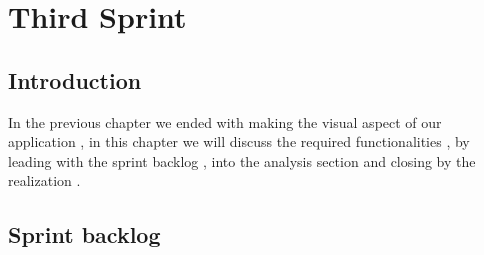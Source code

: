 \documentclass[]{report}
\begin{document}
\chapter{Third Sprint}

\section{Introduction}

In the previous chapter we ended with making the visual aspect of our application , in this chapter we will discuss the required functionalities , by leading with the sprint backlog , into the analysis section and closing by the realization .

\section{Sprint backlog}
\end{document}
